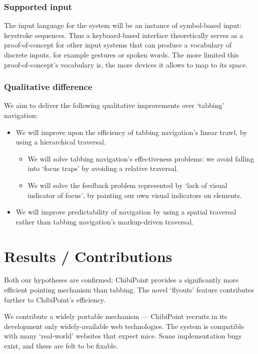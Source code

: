 \documentclass[11pt,openright,a4paper]{report}
\begin{document}
\subsubsection{Supported input}
The input language for the system will be an instance of symbol-based input: keystroke sequences. Thus a keyboard-based interface theoretically serves as a proof-of-concept for other input systems that can produce a vocabulary of discrete inputs, for example gestures or spoken words. The more limited this proof-of-concept's vocabulary is, the more devices it allows to map to its space.

\subsubsection{Qualitative difference}
\label{sec:qualitative_promises}
We aim to deliver the following qualitative improvements over `tabbing' navigation:
\begin{itemize}
\item We will improve upon the efficiency of tabbing navigation's linear trawl, by using a hierarchical traversal.

\begin{itemize}
\item We will solve tabbing navigation's effectiveness problems: we avoid falling into `focus traps' by avoiding a relative traversal.
\item We will solve the feedback problem represented by `lack of visual indicator of focus', by painting our own visual indicators on elements.
\end{itemize}

\item We will improve predictability of navigation by using a spatial traversal rather than tabbing navigation's markup-driven traversal.
\end{itemize}

\section{Results / Contributions}
Both our hypotheses are confirmed: ChibiPoint provides a significantly more efficient pointing mechanism than tabbing. The novel `flyouts' feature contributes further to ChibiPoint's efficiency.

We contribute a widely portable mechanism --- ChibiPoint recruits in its development only widely-available web technologies. The system is compatible with many `real-world' websites that expect mice. Some implementation bugs exist, and these are felt to be fixable.
\end{document}
